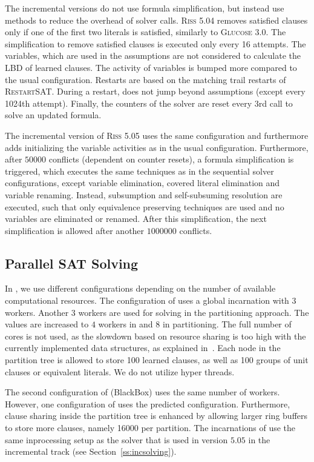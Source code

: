 \documentclass[conference]{IEEEtran}
\begin{document}
The incremental versions do not use formula simplification, but instead use methods to reduce the overhead of solver calls. 
\textsc{Riss 5.04} removes satisfied clauses only if one of the first two literals is satisfied, similarly to \textsc{Glucose 3.0}. 
The simplification to remove satisfied clauses is executed only every 16 attempts. 
The variables, which are used in the assumptions are not considered to calculate the LBD of learned clauses. 
The activity of variables is bumped more compared to the usual configuration. 
Restarts are based on the matching trail restarts of \textsc{RestartSAT}. 
During a restart, \riss does not jump beyond assumptions (except every 1024th attempt). 
Finally, the counters of the solver are reset every $3$rd call to solve an updated formula. 

The incremental version of \textsc{Riss 5.05} uses the same configuration and furthermore adds initializing the variable activities as in the usual configuration. 
Furthermore, after $50000$ conflicts (dependent on counter resets), a formula simplification is triggered, which executes the same techniques as in the sequential solver configurations, except variable elimination, covered literal elimination and variable renaming. 
Instead, subsumption and self-subsuming resolution are executed, such that only equivalence preserving techniques are used and no variables are eliminated or renamed. 
After this simplification, the next simplification is allowed after another $1000000$ conflicts.


\subsection{Parallel SAT Solving}


In \pcasso, we use different configurations depending on the number of available computational resources. 
The configuration of \pcasso uses a global \priss incarnation with $3$ workers. 
Another $3$ workers are used for solving in the partitioning approach. 
The values are increased to $4$ workers in \priss and $8$ in partitioning. 
The full number of cores is not used, as the slowdown based on resource sharing is too high with the currently implemented data structures, as explained in~\cite{portfolioSlowdown}. 
Each node in the partition tree is allowed to store 100 learned clauses, as well as 100 groups of unit clauses or equivalent literals. 
We do not utilize hyper threads. 

The second configuration of \pcasso (BlackBox) uses the same number of workers. 
However, one configuration of \priss uses the predicted configuration. 
Furthermore, clause sharing inside the partition tree is enhanced by allowing larger ring buffers to store more clauses, namely 16000 per partition. 
The incarnations of \riss use the same inprocessing setup as the solver that is used in version $5.05$ in the incremental track (see Section~\ref{ss:incsolving}).
\end{document}
